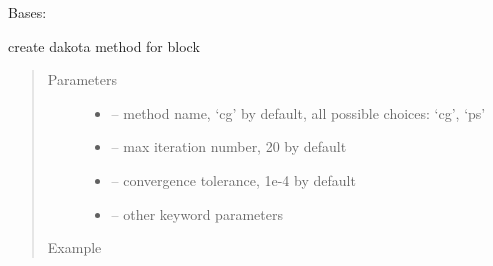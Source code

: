 \documentclass[letterpaper,10pt,english]{sphinxmanual}
\begin{document}
\begin{fulllineitems}
\label{\detokenize{src/apidocs/dakutils:genopt.dakutils.DakotaMethod}}
Bases: \href{https://docs.python.org/2/library/functions.html\#object}{}

create dakota method for  block
\begin{quote}\begin{description}
\item[{Parameters}] \leavevmode\begin{itemize}
\item {} 
 -- method name, `cg' by default, all possible choices: `cg', `ps'

\item {} 
 -- max iteration number, 20 by default

\item {} 
 -- convergence tolerance, 1e-4 by default

\item {} 
 -- other keyword parameters

\end{itemize}

\item[{Example}] \leavevmode
\end{description}\end{quote}


\end{fulllineitems}
\end{document}
